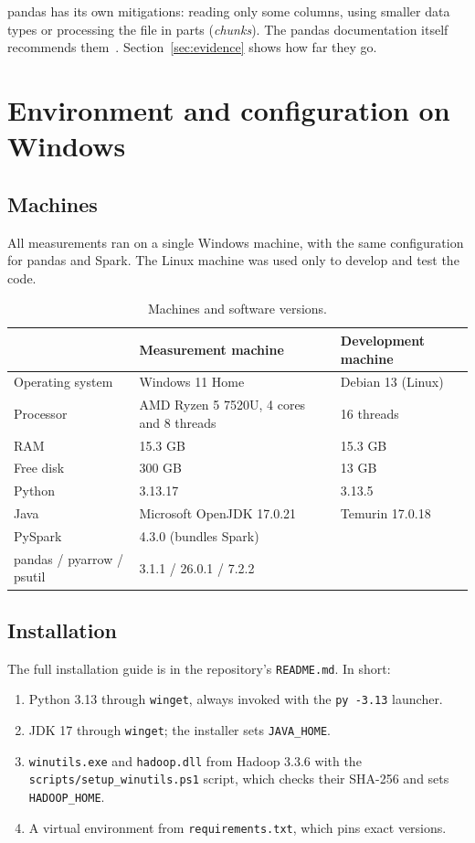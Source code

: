 \documentclass[11pt,a4paper]{article}
\begin{document}
pandas has its own mitigations: reading only some columns, using smaller data types or
processing the file in parts (\emph{chunks}). The pandas documentation itself recommends
them~\cite{pandasscale}. Section~\ref{sec:evidence} shows how far they go.

\section{Environment and configuration on Windows}

\subsection{Machines}

All measurements ran on a single Windows machine, with the same configuration for pandas and
Spark. The Linux machine was used only to develop and test the code.

\begin{table}[H]
\centering
\caption{Machines and software versions.}
\label{tab:environment}
\begin{tabularx}{\textwidth}{lXX}
\toprule
 & Measurement machine & Development machine \\
\midrule
Operating system & Windows 11 Home & Debian 13 (Linux) \\
Processor & AMD Ryzen 5 7520U, 4 cores and 8 threads & 16 threads \\
RAM & 15.3 GB & 15.3 GB \\
Free disk & 300 GB & 13 GB \\
Python & 3.13.17 & 3.13.5 \\
Java & Microsoft OpenJDK 17.0.21 & Temurin 17.0.18 \\
\midrule
PySpark & \multicolumn{2}{l}{4.3.0 (bundles Spark)} \\
pandas / pyarrow / psutil & \multicolumn{2}{l}{3.1.1 / 26.0.1 / 7.2.2} \\
\bottomrule
\end{tabularx}
\end{table}

\subsection{Installation}

The full installation guide is in the repository's \texttt{README.md}. In short:

\begin{enumerate}
  \item Python 3.13 through \texttt{winget}, always invoked with the \texttt{py -3.13}
  launcher.
  \item JDK 17 through \texttt{winget}; the installer sets \texttt{JAVA\_HOME}.
  \item \texttt{winutils.exe} and \texttt{hadoop.dll} from Hadoop 3.3.6 with the
  \texttt{scripts/setup\_winutils.ps1} script, which checks their SHA-256 and sets
  \texttt{HADOOP\_HOME}.
  \item A virtual environment from \texttt{requirements.txt}, which pins exact versions.
\end{enumerate}
\end{document}
